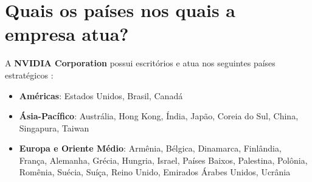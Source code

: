 \section{Quais os países nos quais a empresa atua?}

A \textbf{NVIDIA Corporation} possui escritórios e atua nos seguintes países estratégicos \cite{nvidia_contact_places}:

\begin{itemize}
    \item \textbf{Américas}: Estados Unidos, Brasil, Canadá
    \item \textbf{Ásia-Pacífico}: Austrália, Hong Kong, Índia, Japão, Coreia do Sul, China, Singapura, Taiwan
    \item \textbf{Europa e Oriente Médio}: Armênia, Bélgica, Dinamarca, Finlândia, França, Alemanha, Grécia, Hungria, Israel, Países Baixos, Palestina, Polônia, Romênia, Suécia, Suíça, Reino Unido, Emirados Árabes Unidos, Ucrânia
\end{itemize}